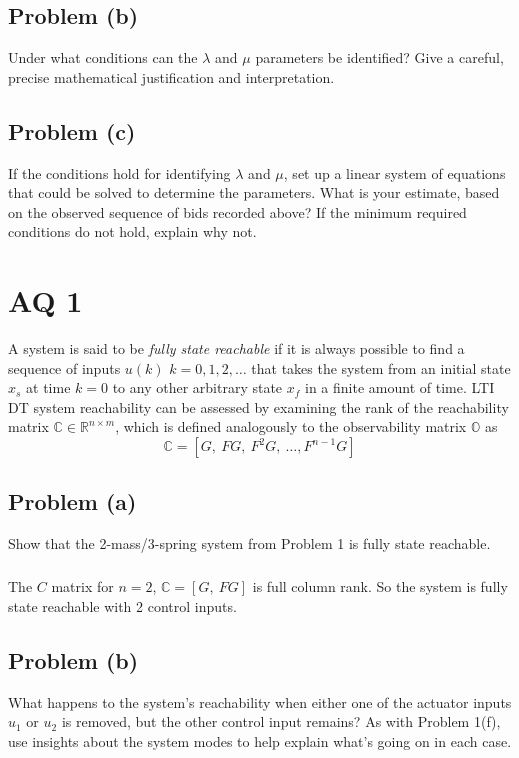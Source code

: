 \documentclass[11pt]{article}
\begin{document}
\subsection*{Problem (b)}
Under what conditions can the $\lambda$ and $\mu$ parameters be identified? Give a careful, precise mathematical justification and interpretation.

\subsection*{Problem (c)}
If the conditions hold for identifying $\lambda$ and $\mu$, set up a linear system of equations that could be solved to determine the parameters. What is your estimate, based on the observed sequence of bids recorded above? If the minimum required conditions do not hold, explain why not.

\section*{AQ 1}
A system is said to be \textit{fully state reachable} if it is always possible to find a sequence of inputs $u(k)$ $k=0,1,2,\dots$ that takes the system from an initial state $x_s$ at time $k=0$ to any other arbitrary state $x_f$ in a finite amount of time. LTI DT system reachability can be assessed by examining the rank of the reachability matrix $\mathbb{C} \in \mathbb{R}^{n\times m}$, which is defined analogously to the observability matrix $\mathbb{O}$ as 
\begin{equation*}
	\mathbb{C} = [G,\ FG,\ F^2G,\ \dots, F^{n-1}G]
\end{equation*}

\subsection*{Problem (a)}
Show that the 2-mass/3-spring system from Problem 1 is fully state reachable.

\subparagraph*{}
The $C$ matrix for $n=2$, $\mathbb{C}=[G,\ FG]$ is full column rank. So the system is fully state reachable with 2 control inputs.

\subsection*{Problem (b)}
What happens to the system's reachability when either one of the actuator inputs $u_1$ or $u_2$ is removed, but the other control input remains? As with Problem 1(f), use insights about the system modes to help explain what's going on in each case.
\end{document}
